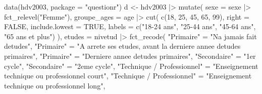 \documentclass[
  letterpaper,
  DIV=11,
  numbers=noendperiod,
  oneside]{scrreprt}
\newenvironment{Shaded}{\begin{snugshade}}{\end{snugshade}}
\newcommand{\AttributeTok}[1]{\textcolor[rgb]{0.40,0.45,0.13}{#1}}
\newcommand{\ConstantTok}[1]{\textcolor[rgb]{0.56,0.35,0.01}{#1}}
\newcommand{\DecValTok}[1]{\textcolor[rgb]{0.68,0.00,0.00}{#1}}
\newcommand{\FunctionTok}[1]{\textcolor[rgb]{0.28,0.35,0.67}{#1}}
\newcommand{\NormalTok}[1]{\textcolor[rgb]{0.00,0.23,0.31}{#1}}
\newcommand{\OtherTok}[1]{\textcolor[rgb]{0.00,0.23,0.31}{#1}}
\newcommand{\SpecialCharTok}[1]{\textcolor[rgb]{0.37,0.37,0.37}{#1}}
\newcommand{\StringTok}[1]{\textcolor[rgb]{0.13,0.47,0.30}{#1}}
\begin{document}
\begin{tcolorbox}[enhanced jigsaw, colbacktitle=quarto-callout-note-color!10!white, opacityback=0, toprule=.15mm, colback=white, coltitle=black, bottomtitle=1mm, toptitle=1mm, titlerule=0mm, rightrule=.15mm, title=\textcolor{quarto-callout-note-color}{\faInfo}\hspace{0.5em}{Code récapitulatif (préparation des données)}, breakable, bottomrule=.15mm, opacitybacktitle=0.6, arc=.35mm, left=2mm, leftrule=.75mm, colframe=quarto-callout-note-color-frame]

\begin{Shaded}
\begin{Highlighting}[]
\FunctionTok{data}\NormalTok{(hdv2003, }\AttributeTok{package =} \StringTok{"questionr"}\NormalTok{)}
\NormalTok{d }\OtherTok{\textless{}{-}}
\NormalTok{  hdv2003 }\SpecialCharTok{|\textgreater{}} 
  \FunctionTok{mutate}\NormalTok{(}
    \AttributeTok{sexe =}\NormalTok{ sexe }\SpecialCharTok{|\textgreater{}} \FunctionTok{fct\_relevel}\NormalTok{(}\StringTok{"Femme"}\NormalTok{),}
    \AttributeTok{groupe\_ages =}\NormalTok{ age }\SpecialCharTok{|\textgreater{}}
      \FunctionTok{cut}\NormalTok{(}
        \FunctionTok{c}\NormalTok{(}\DecValTok{18}\NormalTok{, }\DecValTok{25}\NormalTok{, }\DecValTok{45}\NormalTok{, }\DecValTok{65}\NormalTok{, }\DecValTok{99}\NormalTok{),}
        \AttributeTok{right =} \ConstantTok{FALSE}\NormalTok{,}
        \AttributeTok{include.lowest =} \ConstantTok{TRUE}\NormalTok{,}
        \AttributeTok{labels =} \FunctionTok{c}\NormalTok{(}\StringTok{"18{-}24 ans"}\NormalTok{, }\StringTok{"25{-}44 ans"}\NormalTok{,}
                   \StringTok{"45{-}64 ans"}\NormalTok{, }\StringTok{"65 ans et plus"}\NormalTok{)}
\NormalTok{      ),}
    \AttributeTok{etudes =}\NormalTok{ nivetud }\SpecialCharTok{|\textgreater{}} 
      \FunctionTok{fct\_recode}\NormalTok{(}
        \StringTok{"Primaire"} \OtherTok{=} \StringTok{"N\textquotesingle{}a jamais fait d\textquotesingle{}etudes"}\NormalTok{,}
        \StringTok{"Primaire"} \OtherTok{=} \StringTok{"A arrete ses etudes, avant la derniere annee d\textquotesingle{}etudes primaires"}\NormalTok{,}
        \StringTok{"Primaire"} \OtherTok{=} \StringTok{"Derniere annee d\textquotesingle{}etudes primaires"}\NormalTok{,}
        \StringTok{"Secondaire"} \OtherTok{=} \StringTok{"1er cycle"}\NormalTok{,}
        \StringTok{"Secondaire"} \OtherTok{=} \StringTok{"2eme cycle"}\NormalTok{,}
        \StringTok{"Technique / Professionnel"} \OtherTok{=} \StringTok{"Enseignement technique ou professionnel court"}\NormalTok{,}
        \StringTok{"Technique / Professionnel"} \OtherTok{=} \StringTok{"Enseignement technique ou professionnel long"}\NormalTok{,}

\end{Highlighting}
\end{Shaded}
\end{tcolorbox}
\end{document}
